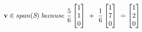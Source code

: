 \documentclass[12 pt]{slides}
\begin{document}
\begingroup
\[\textbf{v} \in span(\emph{S})\ because\ 
\frac{5}{6}\begin{bmatrix}1 \\ 1 \\ 0\end{bmatrix}\ + 
	\ \frac{1}{6}\begin{bmatrix}1 \\ 7 \\ 0\end{bmatrix}\ = 
		\begin{bmatrix}1 \\ 2 \\ 0\end{bmatrix}\]
\endgroup
\end{document}
